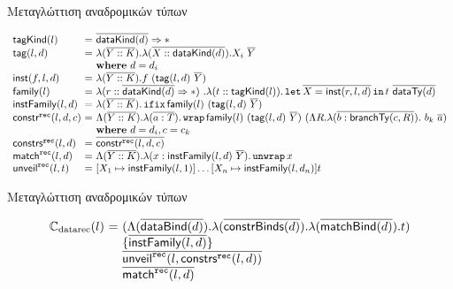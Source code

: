 \documentclass[10pt]{beamer}
\begin{document}
\begin{frame}[shrink = 20]{Μεταγλώττιση αναδρομικών τύπων}

     \begin{minipage}[t]{10cm}
    \centering

       \begin{displaymath}
      \begin{array}{l@{\ }l@{\ }l}

  \tagKind{l}
  &=& \seq{\dataKind{d}} \kindArrow \Type\\
  \dtTag{l}{d}
  &=& \lambda (\seq{Y::K}) . \lambda (\seq{X :: \dataKind{d}}) . X_i\ \seq{Y}\\
  &&\textbf{where}~d=d_i\\
  \dtInst{f}{l}{d}
  &=& \lambda (\seq{Y::K}). f\ (\dtTag{l}{d}\ \seq{Y})\\
  \dtFamily{l}
  &=& \lambda (r :: \seq{\dataKind{d}} \kindArrow \Type)\ . \lambda (t :: \tagKind{l}) .
  \tlet \seq{X = \dtInst{r}{l}{d}} \tin t\ \seq{\scottTy{d}}\\
  \dtInstFinal{l}{d}
  &=& \lambda (\seq{Y::K}) . \ifix \dtFamily{l}\ (\dtTag{l}{d}\ \seq{Y})\\
  \constrRec{l}{d}{c}
  &=&\Lambda (\seq{Y::K}) .
  \lambda (\seq{a : T}) .
  \wrap \dtFamily{l}\ (\dtTag{l}{d}\ \seq{Y})\
  (\Lambda R .
  \lambda (\seq{b : \branchTy{c}{R}}) .
  ~b_k ~ \seq{a})\\
  &&\textbf{where}~d=d_i, c=c_k\\
  \constrsRec{l}{d} &=& \seq{\constrRec{l}{d}{c}}\\
  \matchRec{l}{d}
  &=& \Lambda (\seq{Y::K}). \lambda (x : \dtInstFinal{l}{d}\ \seq{Y}) . \unwrap x\\
  \unveilRec{l}{t}
  &=& \subst{X_1}{\dtInstFinal{l}{1}}{\dots \subst{X_n}{\dtInstFinal{l}{d_n}}{t}} \\
\end{array}
\end{displaymath}
 \end{minipage}

\end{frame}


\begin{frame}{Μεταγλώττιση αναδρομικών τύπων}

  \begin{displaymath}
      \begin{array}{l@{\ }l@{\ }l}
 \compiledatarec(l)
  &=&(\Lambda (\seq{\dataBind{d}}) . \lambda (\seq{\constrBinds{d}}) . \lambda (\seq{\matchBind{d}}) . t)\\
  &&\{ \seq{\dtInstFinal{l}{d}} \} \\
  &&\seq{\unveilRec{l}{\constrsRec{l}{d}}}\\
  &&\seq{\matchRec{l}{d}}
    \end{array}
    \end{displaymath}

\end{frame}
\end{document}

